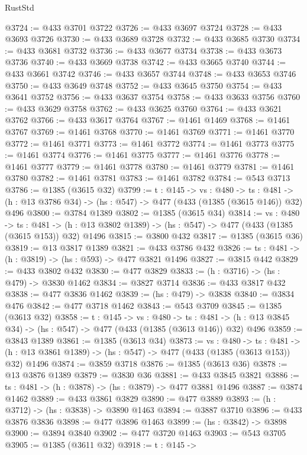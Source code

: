 \begin{lexlean}{RustStd}
\begin{coremodule}
{\begin{coremodule}
{{{{{{{{{{{{{{{{@3724 := @433 @3701 @3722
@3726 := @433 @3697 @3724
@3728 := @433 @3693 @3726
@3730 := @433 @3689 @3728
@3732 := @433 @3685 @3730
@3734 := @433 @3681 @3732
@3736 := @433 @3677 @3734
@3738 := @433 @3673 @3736
@3740 := @433 @3669 @3738
@3742 := @433 @3665 @3740
@3744 := @433 @3661 @3742
@3746 := @433 @3657 @3744
@3748 := @433 @3653 @3746
@3750 := @433 @3649 @3748
@3752 := @433 @3645 @3750
@3754 := @433 @3641 @3752
@3756 := @433 @3637 @3754
@3758 := @433 @3633 @3756
@3760 := @433 @3629 @3758
@3762 := @433 @3625 @3760
@3764 := @433 @3621 @3762
@3766 := @433 @3617 @3764
@3767 := @1461 @1469
@3768 := @1461 @3767
@3769 := @1461 @3768
@3770 := @1461 @3769
@3771 := @1461 @3770
@3772 := @1461 @3771
@3773 := @1461 @3772
@3774 := @1461 @3773
@3775 := @1461 @3774
@3776 := @1461 @3775
@3777 := @1461 @3776
@3778 := @1461 @3777
@3779 := @1461 @3778
@3780 := @1461 @3779
@3781 := @1461 @3780
@3782 := @1461 @3781
@3783 := @1461 @3782
@3784 := @543 @3713
@3786 := @1385 (@3615 @32)
@3799 := {t : @145} ->
  {vs : @480} ->
  {ts : @481} -> (h : @13 @3786 @34) -> (hs : @547) -> @477 (@433 (@1385 (@3615 @146)) @32) @496
@3800 := @3784 @1389
@3802 := @1385 (@3615 @34)
@3814 := {vs : @480} ->
  {ts : @481} -> (h : @13 @3802 @1389) -> (hs : @547) -> @477 (@433 (@1385 (@3615 @153)) @32) @1496
@3815 := @3800 @432
@3817 := @1385 (@3615 @36)
@3819 := @13 @3817 @1389
@3821 := @433 @3786 @432
@3826 := {ts : @481} -> (h : @3819) -> (hs : @593) -> @477 @3821 @1496
@3827 := @3815 @442
@3829 := @433 @3802 @432
@3830 := @477 @3829
@3833 := (h : @3716) -> (hs : @479) -> @3830 @1462
@3834 := @3827 @3714
@3836 := @433 @3817 @432
@3838 := @477 @3836 @1462
@3839 := (hs : @479) -> @3838
@3840 := @3834 @476
@3842 := @477 @3718 @1462
@3843 := @543 @3709
@3845 := @1385 (@3613 @32)
@3858 := {t : @145} ->
  {vs : @480} ->
  {ts : @481} -> (h : @13 @3845 @34) -> (hs : @547) -> @477 (@433 (@1385 (@3613 @146)) @32) @496
@3859 := @3843 @1389
@3861 := @1385 (@3613 @34)
@3873 := {vs : @480} ->
  {ts : @481} -> (h : @13 @3861 @1389) -> (hs : @547) -> @477 (@433 (@1385 (@3613 @153)) @32) @1496
@3874 := @3859 @3718
@3876 := @1385 (@3613 @36)
@3878 := @13 @3876 @1389
@3879 := @3830 @36
@3881 := @433 @3845 @3821
@3886 := {ts : @481} -> (h : @3878) -> (hs : @3879) -> @477 @3881 @1496
@3887 := @3874 @1462
@3889 := @433 @3861 @3829
@3890 := @477 @3889
@3893 := (h : @3712) -> (hs : @3838) -> @3890 @1463
@3894 := @3887 @3710
@3896 := @433 @3876 @3836
@3898 := @477 @3896 @1463
@3899 := (hs : @3842) -> @3898
@3900 := @3894 @3840
@3902 := @477 @3720 @1463
@3903 := @543 @3705
@3905 := @1385 (@3611 @32)
@3918 := {t : @145} ->
}}}}}}}}}}}}}}}}
\end{coremodule}}
\end{coremodule}
\end{lexlean}
